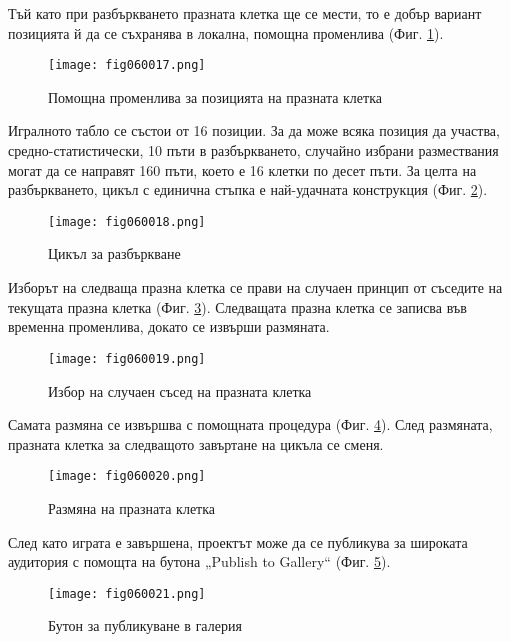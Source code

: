 Тъй като при разбъркването празната клетка ще се мести, то е добър вариант позицията й да се съхранява в локална, помощна променлива (Фиг. \ref{fig060017}).

\begin{figure}[H]
  \centering
  \texttt{[image: fig060017.png]}
  \caption{Помощна променлива за позицията на празната клетка}
\label{fig060017}
\end{figure}

Игралното табло се състои от 16 позиции. За да може всяка позиция да участва, средно-статистически, 10 пъти в разбъркването, случайно избрани размествания могат да се направят 160 пъти, което е 16 клетки по десет пъти. За целта на разбъркването, цикъл с единична стъпка е най-удачната конструкция (Фиг. \ref{fig060018}).

\begin{figure}[H]
  \centering
  \texttt{[image: fig060018.png]}
  \caption{Цикъл за разбъркване}
\label{fig060018}
\end{figure}

Изборът на следваща празна клетка се прави на случаен принцип от съседите на текущата празна клетка  (Фиг. \ref{fig060019}). Следващата празна клетка се записва във временна променлива, докато се извърши размяната.

\begin{figure}[H]
  \centering
  \texttt{[image: fig060019.png]}
  \caption{Избор на случаен съсед на празната клетка}
\label{fig060019}
\end{figure}

Самата размяна се извършва с помощната процедура (Фиг. \ref{fig060020}). След размяната, празната клетка за следващото завъртане на цикъла се сменя.

\begin{figure}[H]
  \centering
  \texttt{[image: fig060020.png]}
  \caption{Размяна на празната клетка}
\label{fig060020}
\end{figure}

След като играта е завършена, проектът може да се публикува за широката аудитория с помощта на бутона „Publish to Gallery“ (Фиг. \ref{fig060021}).

\begin{figure}[H]
  \centering
  \texttt{[image: fig060021.png]}
  \caption{Бутон за публикуване в галерия}
\label{fig060021}
\end{figure}


